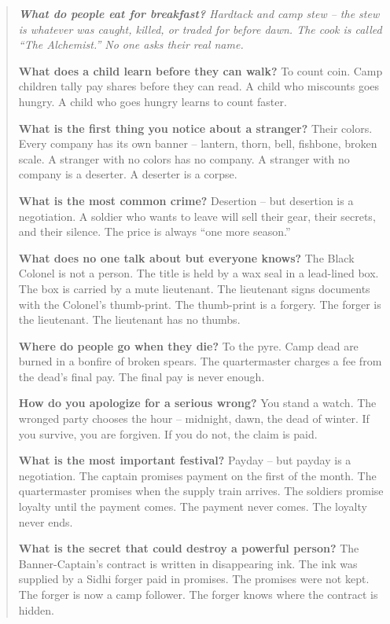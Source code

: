 \documentclass[12pt,oneside]{book}
\newenvironment{almanac}
  {\begin{quote}\small\itshape}
  {\end{quote}}
\begin{document}
\begin{almanac}
\textbf{What do people eat for breakfast?} Hardtack and camp stew -- the stew is whatever was caught, killed, or traded for before dawn. The cook is called ``The Alchemist.'' No one asks their real name.

\textbf{What does a child learn before they can walk?} To count coin. Camp children tally pay shares before they can read. A child who miscounts goes hungry. A child who goes hungry learns to count faster.

\textbf{What is the first thing you notice about a stranger?} Their colors. Every company has its own banner -- lantern, thorn, bell, fishbone, broken scale. A stranger with no colors has no company. A stranger with no company is a deserter. A deserter is a corpse.

\textbf{What is the most common crime?} Desertion -- but desertion is a negotiation. A soldier who wants to leave will sell their gear, their secrets, and their silence. The price is always ``one more season.''

\textbf{What does no one talk about but everyone knows?} The Black Colonel is not a person. The title is held by a wax seal in a lead-lined box. The box is carried by a mute lieutenant. The lieutenant signs documents with the Colonel's thumb-print. The thumb-print is a forgery. The forger is the lieutenant. The lieutenant has no thumbs.

\textbf{Where do people go when they die?} To the pyre. Camp dead are burned in a bonfire of broken spears. The quartermaster charges a fee from the dead's final pay. The final pay is never enough.

\textbf{How do you apologize for a serious wrong?} You stand a watch. The wronged party chooses the hour -- midnight, dawn, the dead of winter. If you survive, you are forgiven. If you do not, the claim is paid.

\textbf{What is the most important festival?} Payday -- but payday is a negotiation. The captain promises payment on the first of the month. The quartermaster promises when the supply train arrives. The soldiers promise loyalty until the payment comes. The payment never comes. The loyalty never ends.

\textbf{What is the secret that could destroy a powerful person?} The Banner-Captain's contract is written in disappearing ink. The ink was supplied by a Sidhi forger paid in promises. The promises were not kept. The forger is now a camp follower. The forger knows where the contract is hidden.
\end{almanac}
\end{document}
